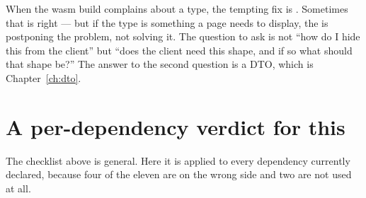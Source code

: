 \begin{antipattern}
When the wasm build complains about a type, the tempting fix is \code{\#[cfg(feature = "ssr")]}.
Sometimes that is right --- but if the type is something a page needs to display, the 
is postponing the problem, not solving it. The question to ask is not ``how do I hide this from
the client'' but ``does the client need this shape, and if so what should that shape be?'' The
answer to the second question is a DTO, which is Chapter~\ref{ch:dto}.
\end{antipattern}

\section{A per-dependency verdict for this }

The checklist above is general. Here it is applied to every dependency currently declared, because
four of the eleven are on the wrong side and two are not used at all.

